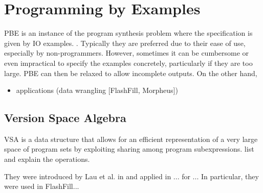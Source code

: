 \section{Programming by Examples}
\label{sec:pbe}


\ac{PBE} is an instance of the program synthesis problem where the specification
is given by \ac{IO} examples.
.
Typically they are preferred due to their ease of use, especially by
non-programmers.
However, sometimes it can be cumbersome or even impractical to specify the
examples concretely, particularly if they are too large.
 \ac{PBE} can then be relaxed to allow
incomplete outputs.
On the other hand, 

\begin{itemize}
\item applications (data wrangling [FlashFill, Morpheus])
\end{itemize}

\subsection{Version Space Algebra}



\ac{VSA} is a data structure that allows for an efficient representation of a
very large space of program sets by exploiting sharing among program
subexpressions.  {list and explain the operations}.

They were introduced by Lau et al. in \cite{Lau:2000} and applied in ... for ...
In particular, they were used in FlashFill...


